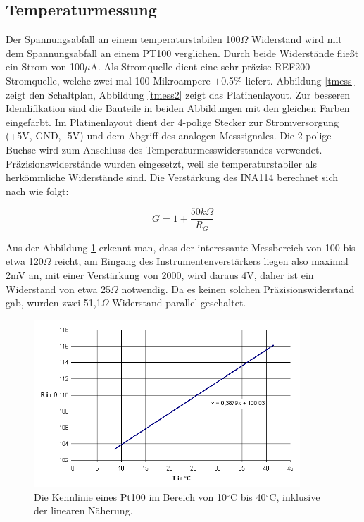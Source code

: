 \documentclass[a4paper,bibtotoc,oneside]{scrbook}
\begin{document}
\subsection{Temperaturmessung}\thispagestyle{empty}
Der Spannungsabfall an einem temperaturstabilen 100$\Omega$ Widerstand wird mit dem Spannungsabfall an einem PT100 verglichen. Durch beide Widerstände fließt ein Strom von 100$\mu$A. Als Stromquelle dient eine sehr präzise REF200-Stromquelle\cite{ref200}, welche zwei mal 100 Mikroampere $\pm$0.5$\%$ liefert. Abbildung \ref{tmess} zeigt den Schaltplan, Abbildung \ref{tmess2} zeigt das Platinenlayout. Zur besseren Idendifikation sind die Bauteile in beiden Abbildungen mit den gleichen Farben eingefärbt. 
Im Platinenlayout dient der 4-polige Stecker zur Stromversorgung (+5V, GND, -5V) und dem Abgriff des analogen Messsignales. Die 2-polige Buchse wird zum Anschluss des Temperaturmesswiderstandes verwendet.
Präzisionswiderstände wurden eingesetzt, weil sie temperaturstabiler als herkömmliche Widerstände sind. 
Die Verstärkung des INA114 berechnet sich nach \cite{ina114} wie folgt:

\begin{equation}
 G = 1 + \frac{50k\Omega}{R_G}
\end{equation} 

Aus der Abbildung \ref{pt100} erkennt man, dass der interessante Messbereich von 100 bis etwa 120$\Omega$ reicht, am Eingang des Instrumentenverstärkers liegen also maximal 2mV an, mit einer Verstärkung von 2000, wird daraus 4V, daher ist ein Widerstand von etwa 25$\Omega$ notwendig. Da es keinen solchen Präzisionswiderstand gab, wurden zwei 51,1$\Omega$ Widerstand parallel geschaltet. 

\begin{figure}[htbp]
\centering
\includegraphics[width=100mm]{img/pt100.png}
\caption{Die Kennlinie eines Pt100 im Bereich von  	10$^{\circ}$C bis 40$^{\circ}$C, inklusive der linearen Näherung.}\label{pt100}
\end{figure}
\end{document}
